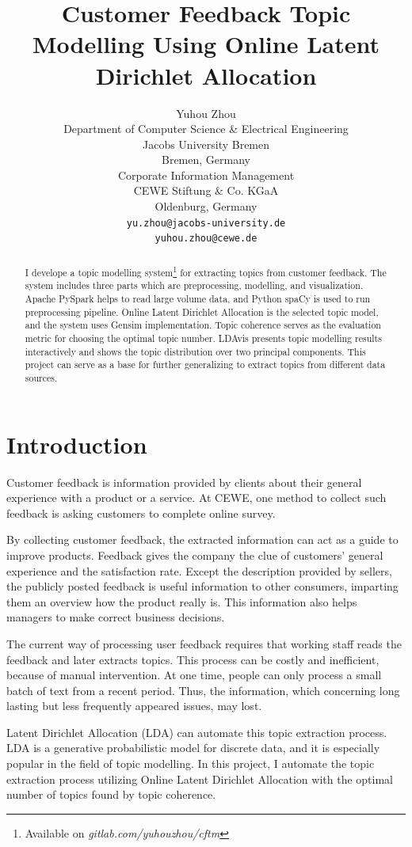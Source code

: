 \documentclass{article} %
\title{Customer Feedback Topic Modelling Using Online Latent Dirichlet Allocation}
\author{
Yuhou Zhou\\
Department of Computer Science \& Electrical Engineering\\
Jacobs University Bremen\\
Bremen, Germany\\
Corporate Information Management\\
CEWE Stiftung \& Co. KGaA\\
Oldenburg, Germany\\
\texttt{yu.zhou@jacobs-university.de}\\
\texttt{yuhou.zhou@cewe.de}\\
}
\begin{document}
\raggedbottom
\maketitle

\begin{abstract}
      I develope a topic modelling system\footnote{Available on \textit{gitlab.com/yuhouzhou/cftm}} for extracting topics from customer feedback. The system includes three parts which are preprocessing, modelling, and visualization. Apache PySpark helps to read large volume data, and Python spaCy is used to run preprocessing pipeline. Online Latent Dirichlet Allocation is the selected topic model, and the system uses Gensim implementation. Topic coherence serves as the evaluation metric for choosing the optimal topic number. LDAvis presents topic modelling results interactively and shows the topic distribution over two principal components. This project can serve as a base for further generalizing to extract topics from different data sources.
\end{abstract}

\section{Introduction}

Customer feedback is information provided by clients about their general experience
with a product or a service. At CEWE, one method to collect such feedback is asking
customers to complete online survey.

By collecting customer feedback, the extracted information can act as a guide to
improve products. Feedback gives the company the clue of customers' general experience
and the satisfaction rate. Except the description provided by sellers, the publicly
posted feedback is useful information to other consumers, imparting them an overview
how the product really is. This information also helps managers to make correct business
decisions.

The current way of processing user feedback requires that working staff reads the
feedback and later extracts topics. This process can be costly and inefficient,
because of manual intervention. At one time, people can only process a small batch of
text from a recent period. Thus, the information, which concerning long lasting but
less frequently appeared issues, may lost.

Latent Dirichlet Allocation (LDA) can automate this topic extraction process. LDA is a generative probabilistic model for discrete data, and it is especially popular in the field of topic modelling.
In this project, I automate the topic extraction process utilizing Online Latent Dirichlet Allocation with the optimal number of topics found by topic coherence.
\end{document}
